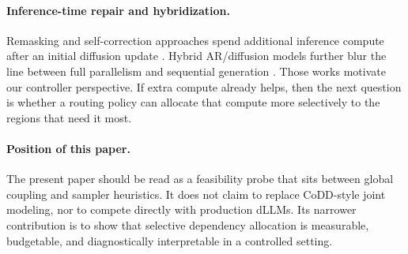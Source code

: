 \paragraph{Inference-time repair and hybridization.}
Remasking and self-correction approaches spend additional inference compute after an initial diffusion update \citep{wang2025remasking,zhang2026selfcorrection}. Hybrid AR/diffusion models further blur the line between full parallelism and sequential generation \citep{fathi2025unifying,sahoo2026esolm}. Those works motivate our controller perspective. If extra compute already helps, then the next question is whether a routing policy can allocate that compute more selectively to the regions that need it most.

\paragraph{Position of this paper.}
The present paper should be read as a feasibility probe that sits between global coupling and sampler heuristics. It does not claim to replace CoDD-style joint modeling, nor to compete directly with production dLLMs. Its narrower contribution is to show that selective dependency allocation is measurable, budgetable, and diagnostically interpretable in a controlled setting.
